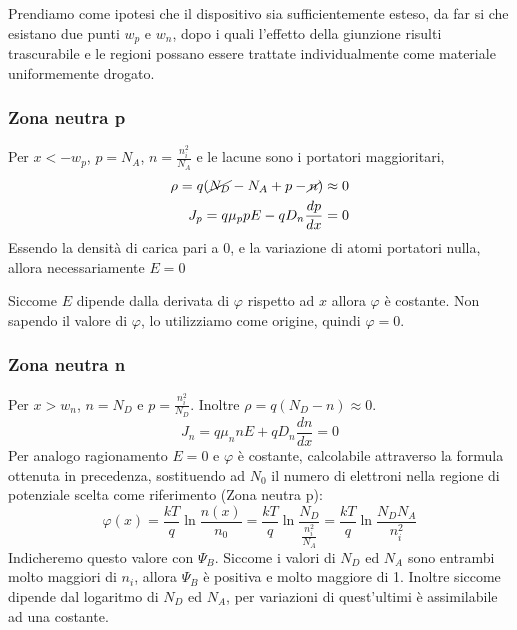 \documentclass[../template]{subfiles}
\begin{document}
Prendiamo come ipotesi che il dispositivo sia sufficientemente esteso, da far si che esistano due punti $w_p$ e $w_n$, dopo i quali l'effetto della giunzione risulti trascurabile
e le regioni possano essere trattate individualmente come materiale uniformemente drogato.

\subsubsection{Zona neutra p}
    Per $x < -w_p$, $p = N_A$, $n = \frac{n_i^2}{N_A}$ e le lacune sono i portatori maggioritari,
    \begin{align*}
        \rho = q (\cancel{N_D} - N_A + p - \cancel{n}) \approx  0\\
        J_p = q \mu_p p E - q D_n \frac{dp}{dx} = 0
    \end{align*}
    Essendo la densità di carica pari a 0, e la variazione di atomi portatori nulla, allora necessariamente $E = 0$

    Siccome $E$ dipende dalla derivata di $\varphi$ rispetto ad $x$ allora $\varphi$ è costante.
    Non sapendo il valore di $\varphi$, lo utilizziamo come origine, quindi $\varphi = 0$.

\subsubsection{Zona neutra n}
    Per $x > w_n$, $n = N_D$ e $p = \frac{n_i^2}{N_D}$. Inoltre $\rho = q (N_D - n) \approx 0$.
    \[
        J_n = q \mu_n n E + q D_n \frac{dn}{dx} = 0
    \]
    Per analogo ragionamento $E = 0$ e $\varphi$ è costante, calcolabile attraverso la formula ottenuta in precedenza, sostituendo ad $N_0$ il numero
    di elettroni nella regione di potenziale scelta come riferimento (Zona neutra p):
    \[
        \varphi(x) = \frac{kT}{q} \ln \frac{n(x)}{n_0} = \frac{kT}{q} \ln \frac{N_D}{\frac{n_i^2}{N_A}} = \frac{kT}{q} \ln \frac{N_D N_A}{n_i^2}
    \]
    Indicheremo questo valore con $\Psi_B$. Siccome i valori di $N_D$ ed $N_A$ sono entrambi molto maggiori di $n_i$, allora $\Psi_B$ è positiva e molto maggiore di 1.
    Inoltre siccome dipende dal logaritmo di $N_D$ ed $N_A$, per variazioni di quest'ultimi è assimilabile ad una costante.
\end{document}
